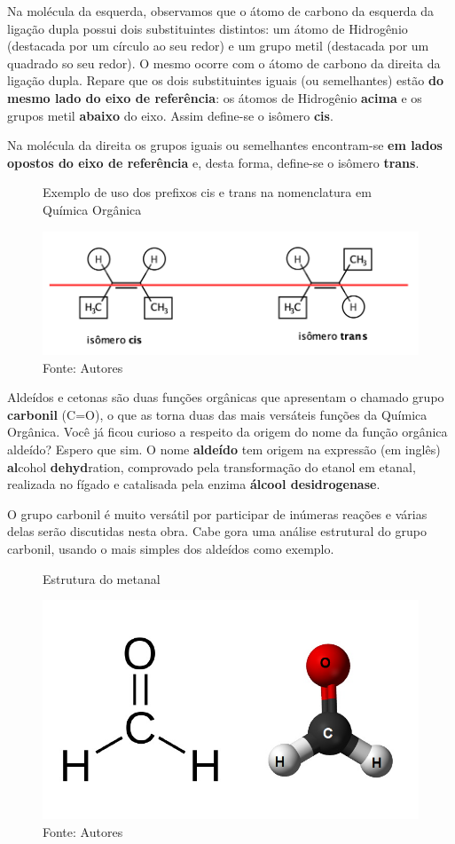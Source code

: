 Na molécula da esquerda, observamos que o átomo de carbono da esquerda da ligação dupla possui dois substituintes distintos: um átomo de Hidrogênio (destacada por um círculo ao seu redor) e um grupo metil (destacada por um quadrado so seu redor). O mesmo ocorre com o átomo de carbono da direita da ligação dupla. Repare que os dois substituintes iguais (ou semelhantes) estão \textbf{do mesmo lado do eixo de referência}: os átomos de Hidrogênio \textbf{acima} e os grupos metil \textbf{abaixo} do eixo. Assim define-se o isômero \textbf{cis}.

Na molécula da direita os grupos iguais ou semelhantes encontram-se \textbf{em lados opostos do eixo de referência} e, desta forma, define-se o isômero \textbf{trans}.		

\begin{figure}[h]
	\centering
	\caption{Exemplo de uso dos prefixos cis e trans na nomenclatura em Química Orgânica}
	\vspace{0.5cm}
	\includegraphics[width=0.85\linewidth]{imagens/cistrans.png}
	\caption*{Fonte: Autores}
	\label{fig:cistrans}
\end{figure}

Aldeídos e cetonas são duas funções orgânicas que apresentam o chamado grupo \textbf{carbonil} (C=O), o que as torna duas das mais versáteis funções da Química Orgânica. Você já ficou curioso a respeito da origem do nome da função orgânica aldeído? Espero que sim. O nome \textbf{aldeído} tem origem na expressão (em inglês) \textbf{al}cohol \textbf{dehyd}ration, comprovado pela transformação do etanol em etanal, realizada no fígado e catalisada pela enzima \textbf{álcool desidrogenase}.

O grupo carbonil é muito versátil por participar de inúmeras reações e várias delas serão discutidas nesta obra. Cabe gora uma análise estrutural do grupo carbonil, usando o mais simples dos aldeídos como exemplo.

\begin{figure}[h]
	\centering
	\caption{Estrutura do metanal}
	\vspace{0.5cm}
	\includegraphics[width=0.35\linewidth]{imagens/formaldeido2.png}
	\caption*{Fonte: Autores}
	\label{fig:}
\end{figure}

